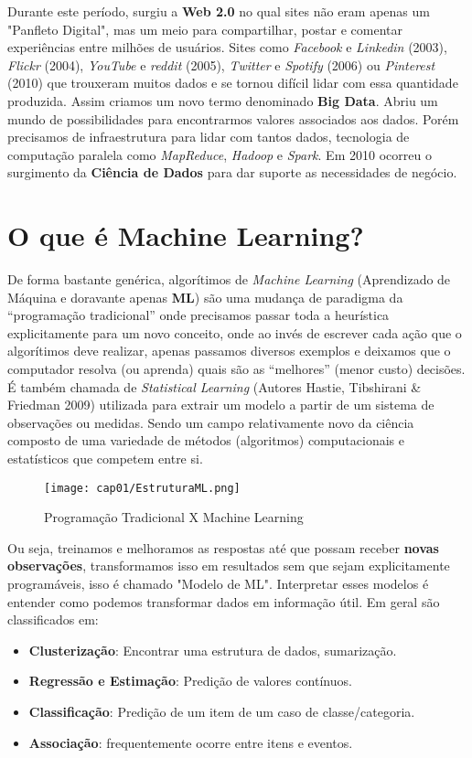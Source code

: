 Durante este período, surgiu a \textbf{Web 2.0} no qual sites não eram apenas um "Panfleto Digital", mas um meio para compartilhar, postar e comentar experiências entre milhões de usuários. Sites como \textit{Facebook} e \textit{Linkedin} (2003), \textit{Flickr} (2004), \textit{YouTube} e \textit{reddit} (2005), \textit{Twitter} e \textit{Spotify} (2006) ou \textit{Pinterest} (2010) que trouxeram muitos dados e se tornou difícil lidar com essa quantidade produzida. Assim criamos um novo termo denominado \textbf{Big Data}. Abriu um mundo de possibilidades para encontrarmos valores associados aos dados. Porém precisamos de infraestrutura para lidar com tantos dados, tecnologia de computação paralela como \textit{MapReduce}, \textit{Hadoop} e \textit{Spark}. Em 2010 ocorreu o surgimento da \textbf{Ciência de Dados} para dar suporte as necessidades de negócio.

\section{O que é Machine Learning?}
De forma bastante genérica, algorítimos de \textit{Machine Learning} (Aprendizado de Máquina e doravante apenas \textbf{ML}) são uma mudança de paradigma da “programação tradicional” onde precisamos passar toda a heurística explicitamente para um novo conceito, onde ao invés de escrever cada ação que o algorítimos deve realizar, apenas passamos diversos exemplos e deixamos que o computador resolva (ou aprenda) quais são as “melhores” (menor custo) decisões. É também chamada de \textit{Statistical Learning} (Autores Hastie, Tibshirani \& Friedman 2009) utilizada para extrair um modelo a partir de um sistema de observações ou medidas. Sendo um campo relativamente novo da ciência composto de uma variedade de métodos (algoritmos) computacionais e estatísticos que competem entre si.
\begin{figure}[H]
	\centering
	\texttt{[image: cap01/EstruturaML.png]}
	\caption{Programação Tradicional X Machine Learning}
\end{figure}

Ou seja, treinamos e melhoramos as respostas até que possam receber \textbf{novas observações}, transformamos isso em resultados sem que sejam explicitamente programáveis, isso é chamado "Modelo de ML". Interpretar esses modelos é entender como podemos transformar dados em informação útil. Em geral são classificados em:
\begin{itemize}[noitemsep]
	\item \textbf{Clusterização}: Encontrar uma estrutura de dados, sumarização.
	\item \textbf{Regressão e Estimação}: Predição de valores contínuos.
	\item \textbf{Classificação}: Predição de um item de um caso de classe/categoria.
	\item \textbf{Associação}: frequentemente ocorre entre itens e eventos.
\end{itemize}

